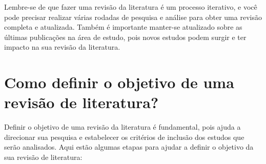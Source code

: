 \documentclass[12pt,a4paper, brazil]{article}
\begin{document}
Lembre-se de que fazer uma revisão da literatura é um processo iterativo, e você pode precisar realizar várias rodadas de pesquisa e análise para obter uma revisão completa e atualizada. Também é importante manter-se atualizado sobre as últimas publicações na área de estudo, pois novos estudos podem surgir e ter impacto na sua revisão da literatura.

\section{Como definir o objetivo de uma revisão de literatura?}

Definir o objetivo de uma revisão da literatura é fundamental, pois ajuda a direcionar sua pesquisa e estabelecer os critérios de inclusão dos estudos que serão analisados. Aqui estão algumas etapas para ajudar a definir o objetivo da sua revisão de literatura:
\end{document}
